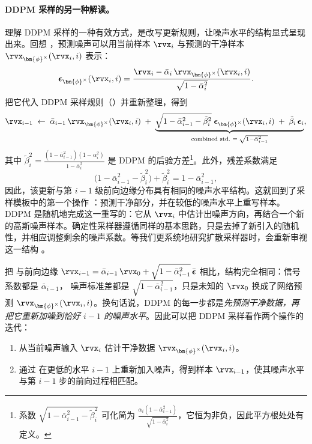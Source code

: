 \paragraph{DDPM 采样的另一种解读。}
理解 DDPM 采样的一种有效方式，是改写更新规则，让噪声水平的结构显式呈现出来。回想 ，预测噪声可以用当前样本 $\rvx_i$ 与预测的干净样本 $\rvx_{\bm{\phi}^\times}(\rvx_i,i)$ 表示：
\[
\boldsymbol{\epsilon}_{\bm{\phi}^\times}(\rvx_i,i)
=
\frac{\rvx_i - \bar{\alpha}_i\,\rvx_{\bm{\phi}^\times}(\rvx_i,i)}
     {\sqrt{1-\bar{\alpha}_i^2}}.
\]
把它代入 DDPM 采样规则（）并重新整理，得到
\begin{equation}\label{eq:ddpm-renoise}
\rvx_{i-1}
\;\leftarrow\;
\bar{\alpha}_{i-1}\,\rvx_{\bm{\phi}^\times}(\rvx_i,i)
\;+\;
\underbrace{
  \sqrt{1-\bar{\alpha}_{i-1}^2 - \tilde{\beta}_i^2}\;
  \boldsymbol{\epsilon}_{\bm{\phi}^\times}(\rvx_i,i)
  \;+\;
  \tilde{\beta}_i\,\boldsymbol{\epsilon}_i
}_{\text{combined std.\ }=\;\sqrt{1-\bar{\alpha}_{i-1}^2}},
\end{equation}
其中 $\tilde{\beta}_i^2
= \frac{(1-\bar{\alpha}_{i-1}^2)(1-\alpha_i^2)}{1-\bar{\alpha}_i^2}$
是 DDPM 的后验方差\footnote{
系数
$\sqrt{1-\bar{\alpha}_{i-1}^2 - \tilde{\beta}_i^2}$
可化简为
$\frac{\alpha_i(1-\bar{\alpha}_{i-1}^2)}{\sqrt{1-\bar{\alpha}_i^2}}$，它恒为非负，因此平方根处处有定义。}。此外，残差系数满足
\[
\bigl(1-\bar{\alpha}_{i-1}^2-\tilde{\beta}_i^2\bigr)+\tilde{\beta}_i^2
=
1-\bar{\alpha}_{i-1}^2,
\]
因此，该更新与第 $i-1$ 级前向边缘分布具有相同的噪声水平结构。这就回到了采样模板中的第一个操作 ：预测干净部分，并在较低的噪声水平上重写样本。DDPM 是随机地完成这一重写的：它从 $\rvx_i$ 中估计出噪声方向，再结合一个新的高斯噪声样本。确定性采样器遵循同样的基本思路，只是去掉了新引入的随机性，并相应调整剩余的噪声系数。等我们更系统地研究扩散采样器时，会重新审视这一结构 。

把  与前向边缘
$\rvx_{i-1} = \bar{\alpha}_{i-1}\,\rvx_0
+ \sqrt{1-\bar{\alpha}_{i-1}^2}\,\bar{\boldsymbol{\epsilon}}$ 相比，结构完全相同：信号系数都是 $\bar{\alpha}_{i-1}$，
噪声标准差都是 $\sqrt{1-\bar{\alpha}_{i-1}^2}$，只是未知的 $\rvx_0$ 换成了网络预测 $\rvx_{\bm{\phi}^\times}(\rvx_i,i)$。换句话说，DDPM 的每一步都是\emph{先预测干净数据，再把它重新加噪到恰好 $i{-}1$ 的噪声水平}。因此可以把 DDPM 采样看作两个操作的迭代：
\begin{enumerate}
    \item {} 从当前噪声输入 $\rvx_i$ 估计干净数据 $\rvx_{\bm{\phi}^\times}(\rvx_i, i)$。
    \item {} 通过  在更低的水平 $i{-}1$ 上重新加入噪声，得到样本 $\rvx_{i-1}$，使其噪声水平与第 $i{-}1$ 步的前向过程相匹配。
\end{enumerate}


